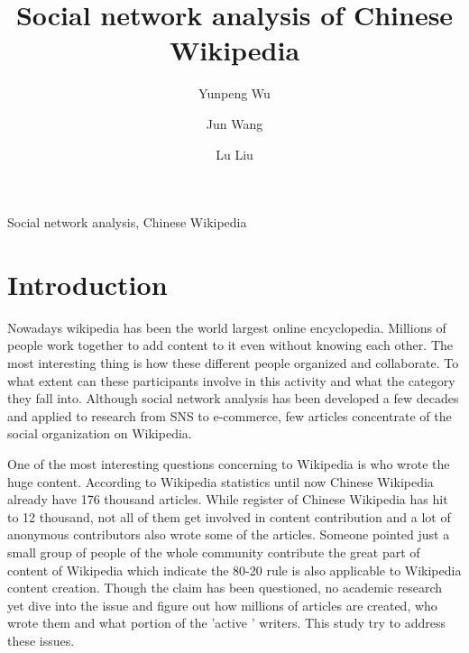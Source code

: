 \documentclass{elsarticle}
\begin{document}
\begin{frontmatter}
  \title{Social network analysis of Chinese Wikipedia }

  \author[buaa]{Yunpeng Wu}
  \author[buaa]{Jun Wang}
  \author[buaa]{Lu Liu}
  

  \address[buaa]{School of Economics \& Management, Beihang University, 
    Beijing 100083, P.R. China}
  
  \begin{abstract}
  
  \end{abstract}

  \begin{keyword}
    Social network analysis, Chinese Wikipedia
  \end{keyword}

\end{frontmatter}

\listoftodos
\section{Introduction}
\label{sec:introduction}
Nowadays wikipedia has been the world largest online
encyclopedia. Millions of people work together to add content to it
even without knowing each other. The most interesting thing is how
these different people organized and collaborate. To what extent can
these participants involve in this activity and what the category they
fall into. Although social network analysis has been developed a few
decades and applied to research from SNS to e-commerce, few articles
concentrate of the social organization on Wikipedia.

One of the most interesting questions concerning to Wikipedia is who
wrote the huge content. According to Wikipedia statistics until now
Chinese Wikipedia already have 176 thousand articles\cite{wikistat}.
While  register of Chinese Wikipedia has hit to  12
thousand, not all of them get involved in content contribution and
a lot of anonymous contributors also wrote some of the
articles. Someone pointed just a small group of people of the whole
community contribute the great part of content of Wikipedia which
indicate the 80-20 rule is also applicable to Wikipedia content
creation\cite{aswartz}. Though the claim has been questioned, no
academic research yet dive into the issue and figure out how millions
of articles are created, who wrote them and what portion of the
'active ' writers. This study try to address these issues.
\end{document}
